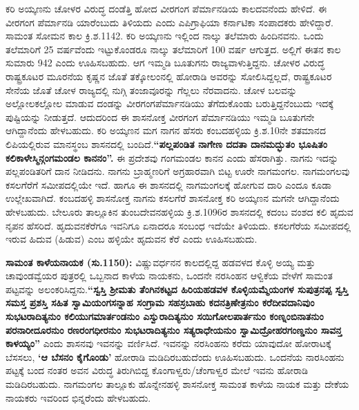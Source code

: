 \newpage

ಕರಿ ಅಯ್ಕಣನು ಚೋಳರ ವಿರುದ್ಧ ದಂಡೆತ್ತಿ ಹೋದ ವೀರಗಂಗ ಪೆರ್ಮಾನಡಿಯ ಕಾಲದವನೆಂದು ಹೇಳಿದೆ. ಈ ವೀರಗಂಗ ಪೆರ್ಮಾನಡಿ ಯಾರೆಂಬುದು ತಿಳಿಯದು ಎಂದು ಎಪಿಗ್ರಾಫಿಯಾ ಕರ್ನಾಟಿಕಾ ಸಂಪಾದಕರು ಹೇಳಿದ್ದಾರೆ. ಸಾಮಂತ ಸೋಮನ ಕಾಲ ಕ್ರಿ.ಶ.1142. ಕರಿ ಅಯ್ಕಣನು ಇಲ್ಲಿಂದ ನಾಲ್ಕು ತಲೆಮಾರು ಹಿಂದಿನವನು. ಒಂದು ತಲೆಮಾರಿಗೆ 25 ವರ್ಷವೆಂದು ಇಟ್ಟುಕೊಂಡರೂ ನಾಲ್ಕು ತಲೆಮಾರಿಗೆ 100 ವರ್ಷ ಆಗುತ್ತದ. ಅಲ್ಲಿಗೆ ಈತನ ಕಾಲ ಸುಮಾರು 942 ಎಂದು ಊಹಿಸಬಹುದು. ಆಗ ಇಮ್ಮಡಿ ಬೂತುಗನು ರಾಜ್ಯವಾಳುತ್ತಿದ್ದನು. ಚೋಳರ ವಿರುದ್ಧ ರಾಷ್ಟ್ರಕೂಟರ ಮೂರನೆಯ ಕೃಷ್ಣನ ಜೊತೆ ತಕ್ಕೋಲಂನಲ್ಲಿ ಹೋರಾಡಿ ಅವರನ್ನು ಸೋಲಿಸಿದ್ದಲ್ಲದೆ, ರಾಷ್ಟ್ರಕೂಟರ ಸೇನೆಯ ಜೊತೆ ಚೋಳ ರಾಜ್ಯದಲ್ಲಿ ನುಗ್ಗಿ ತಂಜಾವೂರನ್ನು ಗೆಲ್ಲಲು ನೆರವಾದನು. ಚೋಳ ಬಲವನ್ನು ಅಲ್ಲೋಲಕಲ್ಲೋಲ ಮಾಡುವ ದಂಡನ್ನು ವೀರಗಂಗಪೆರ್ಮಾನಡಿಯು ತೆಗೆದುಕೊಂಡು ಬರುತ್ತಿದ್ದನೆಂಬುದು ಇದಕ್ಕೆ ಪುಷ್ಟಿಯನ್ನು ನೀಡುತ್ತದೆ. ಆದುದರಿಂದ ಈ ಶಾಸನೋಕ್ತ ವೀರಗಂಗ ಪೆರ್ಮಾನಡಿಯು ಇಮ್ಮಡಿ ಬೂತುಗನೇ ಆಗಿದ್ದಾನೆಂದು ಹೇಳಬಹುದು. ಕರಿ ಅಯ್ಕಣನ ಮಗ ನಾಗನ ಹೆಸರು ಕಂಬದಹಳ್ಳಿಯ ಕ್ರಿ.ಶ.10ನೇ ಶತಮಾನದ ಲಿಪಿಯಲ್ಲಿರುವ ಮಾನಸ್ಥಂಬ ಶಾಸನದಲ್ಲಿ ಬಂದಿದೆ.\textbf{“ಪಲ್ಲಪಂಡಿತ ನಾಗೇಣ ದದತಾ ದಾನಮದ್ಭುತಂ ಭೂಷಿತಂ ಕಲಿಕಾಳೇಸ್ಮಿನ್ಗಂಗಮಂಡಲ ಕಾನನಂ”.} ಈ ಪ್ರದೇಶವು ಗಂಗಮಂಡಲ ಕಾನನ ಎಂದು ಹೆಸರಾಗಿತ್ತು. ನಾಗನು ಇದನ್ನು ಪಲ್ಲಪಂಡಿತರಿಗೆ ದಾನ ನೀಡಿದನು. ನಾಗನು ಬ್ರಾಹ್ಮಣರಿಗೆ ಅಗ್ರಹಾರವಾಗಿ ಬಿಟ್ಟ ಊರೇ ನಾಗಮಂಗಲ. ನಾಗಮಂಗಲವು ಕಸಲಗೆರೆಗೆ ಸಮೀಪದಲ್ಲಿಯೇ ಇದೆ. ಹಾಗೂ ಈ ಶಾಸನದಲ್ಲಿ ನಾಗಮಂಗಲಕ್ಕೆ ಹೋಗುವ ದಾರಿ ಎಂದೂ ಕೂಡಾ ಉಲ್ಲೇಖವಾಗಿದೆ. ಕಂಬದಹಳ್ಳಿ ಶಾಸನೋಕ್ತ ನಾಗನು ಕಸಲಗೆರೆ ಶಾಸನೋಕ್ತ ಕರಿ ಅಯ್ಕಣನ ಮಗನೇ ಆಗಿದ್ದಾನೆಂದು ಹೇಳಬಹುದು. ಬೇಲೂರು ತಾಲ್ಲೂಕಿನ ತುಂಬದೇವನಹಳ್ಳಿಯ ಕ್ರಿ.ಶ.1096ರ ಶಾಸನದಲ್ಲಿ ಕದಂಬ ವಂಶದ ಕಲಿ ಹೃದುವ ನೃಪನ ಹೆಸರಿದೆ. ಹೃದುವನಕೆರೆಗೂ ಇವನಿಗೂ ಏನಾದರೂ ಸಂಬಂಧ ಇದೆಯೇ ತಿಳಿಯದು. ಕಸಲಗೆರೆಯ ಸಮೀಪದಲ್ಲಿ ಇರುವ ಹಿದುವ (ಹಿಡುವ) ಎಂಬ ಹಳ್ಳಿಯೇ ಹೃದುವನ ಕೆರೆ ಎಂದು ಊಹಿಸಬಹುದು.

\vskip 3pt

\textbf{ಸಾಮಂತ ಕಾಳೆಯನಾಯಕ (ಸು.1150):} ವಿಷ್ಣುವರ್ಧನನ ಕಾಲದಲ್ಲಿದ್ದ ಹಡವಳದ ಕೊಳ್ಳಿ ಅಯ್ಯ ಮತ್ತು ಚಾವುಂಡವ್ವೆ\-ಯರ ಪುತ್ರರಲ್ಲಿ ಒಬ್ಬನಾದ ಕಾಳೆಯ ನಾಯಕನು, ಒಂದನೇ ನರಸಿಂಹನ ಆಳ್ವಿಕೆಯ ವೇಳೆಗೆ ಸಾಮಂತ ಪಟ್ಟವನ್ನು ಅಲಂಕರಿಸಿದ್ದನು.\textbf{“ಸ್ವಸ್ತಿ ಶ‍್ರೀಮತು ತೆಂಗಿನಕಟ್ಟದ ಹಿರಿಯಹಡವಳ ಕೊಳ್ಳಿಯಮ್ಮೆಯಂಗಳ ಸುಪುತ್ರನಪ್ಪ ಸ್ವಸ್ತಿ ಸಮಸ್ತ ಪ್ರಶಸ್ತಿ ಸಹಿತ ಸ್ವಾಮಿಯಂಗಸನ್ನಾಹ ಸಂಗ್ರಾಮ ಸಹಸ್ರಬಾಹು ಕದನತ್ರಿಣೇತ್ರನುಂ ಕರೆದೀವದಾನಿವುಂ ಸುಭಟರಾದಿತ್ಯನುಂ ಕಲಿಯುಗಮಾರ್ತಂಡನುಂ ಎಸ್ವುರಾದಿತ್ಯನುಂ ಸಯಿಗೋಲಪಾರ್ತನುಂ ಕಂಣ್ನಂಬಿನಾತನುಂ ಪರನಾರೀದೂರನುಂ\general{\break } ರಣರಂಗಧೀರನುಂ ಸುಭಟರಾದಿತ್ಯನುಂ ಸತ್ಯರಾಧೇಯನುಂ ಸ್ವಾಮಿದ್ರೋಹರಗಂಣ್ಡನುಂ ಸಾವನ್ತ ಕಾಳಯ್ಯಂ”} ಎಂದು ಶಾಸನವು ಇವನನ್ನು ವರ್ಣಿಸಿದೆ. ಇವನನ್ನು ನರಸಿಂಹನು ಕರೆದು ಯಾವುದೋ ಹೋರಾಟಕ್ಕೆ ಬೆಸಸಲು, \textbf{‘ಆ ಬೆಸನಂ ಕೈಗೊಂಡು’} ಹೋರಾಡಿ ಮಡಿದಿರಬಹುದೆಂದು ಊಹಿಸಬಹುದು. ಒಂದನೆಯ ನಾರಸಿಂಹನು ಪಟ್ಟಕ್ಕೆ ಬಂದ ನಂತರ ಅವನ ವಿರುದ್ಧ ತಿರುಗಿಬಿದ್ದ ಕೊಂಗಾಳ್ವರು/ಚೆಂಗಾಳ್ವರ ಮೇಲೆ ಇವನು ಹೋರಾಡಿ ಮಡಿದಿರಬಹುದು. ನಾಗಮಂಗಲ ತಾಲ್ಲೂಕು ಹೊನ್ನೇನಹಳ್ಳಿ ಶಾಸನೋಕ್ತ ಸಾಮಂತ ಕಾಳೆಯ ನಾಯಕ ಮತ್ತು ದೇಕೆಯ ನಾಯಕರು ಇವರಿಂದ ಭಿನ್ನರೆಂದು ಹೇಳಬಹುದು.

